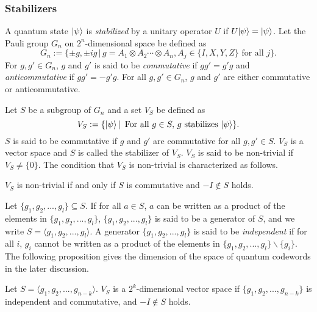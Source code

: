 \subsubsection{Stabilizers}
A quantum state $|\psi\rangle$ is \emph{stabilized} by a unitary operator
$U$ if $U|\psi\rangle = |\psi\rangle$. Let the Pauli group $G_n$ on
$2^n$-dimensional space be defined as
\[
 G_n := \{\pm g, \pm ig \,|\, g = A_1 \otimes A_2 \cdots \otimes A_n,
 A_j \in \{I, X, Y, Z\} \mbox{ for all } j\}.
\]
For $g, g' \in G_n$, $g$ and $g'$ is said to be \emph{commutative}
if $gg' = g'g$ and \emph{anticommutative} if $gg' = -g'g$. For all $g, g'
\in G_n$, $g$ and $g'$ are either commutative or
anticommutative.

Let $S$ be a subgroup of $G_n$ and a set $V_S$ be defined
as
\[
 V_S := \{|\psi\rangle \,|\, \mbox{ For all } g \in S,\, g \mbox{ stabilizes
} |\psi\rangle \}.
\]
$S$ is said to be commutative if $g$ and $g'$ are
commutative for all $g, g' \in S$.
$V_S$ is a vector space and $S$ is called the stabilizer of $V_S$.
$V_S$ is said to be non-trivial if $V_S \neq \{0\}$.
The condition that $V_S$ is non-trivial is characterized as follows.

\begin{prop}
 $V_S$ is non-trivial if and only if
 $S$ is commutative and $-I \notin S$ holds.
\end{prop}

Let $\{g_1, g_2, ...,g_l\} \subseteq S$.
If for all $a \in S$, $a$ can be written as a product of
the elements in $\{g_1, g_2, ...,g_l\}$, $\{g_1,g_2,...,g_l\}$ is
said to be a generator of $S$, and we write $S = \langle
g_1, g_2,...,g_l \rangle$. 
A generator $\{g_1, g_2, ...,g_l\}$ is said to be
\emph{independent} if for all $i$, $g_i$ cannot be written as a
product of the elements in $\{g_1, g_2, ...,g_l\} \backslash \{g_i\}$.
The following proposition gives the dimension of the space
of quantum codewords in the later discussion.

\begin{prop}
 Let $S = \langle g_1, g_2,...,g_{n - k} \rangle$. $V_S$ is 
 a $2^k$-dimensional vector space if
 $\{g_1, g_2, ...,g_{n - k}\}$ is independent and commutative,
 and $-I \notin S$ holds.
\end{prop}

